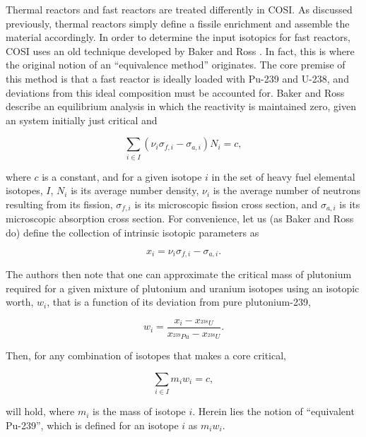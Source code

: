 Thermal reactors and fast reactors are treated differently in COSI. As discussed
previously, thermal reactors simply define a fissile enrichment and assemble the
material accordingly. In order to determine the input isotopics for fast
reactors, COSI uses an old technique developed by Baker and Ross
\cite{baker_comparison_1963}. In fact, this is where the original notion of an
``equivalence method'' originates. The core premise of this method is that a
fast reactor is ideally loaded with Pu-239 and U-238, and deviations from this
ideal composition must be accounted for. Baker and Ross describe an equilibrium
analysis in which the reactivity is maintained zero, given an system initially
just critical and

\begin{equation}
\sum_{i \in I} \left( \nu_{i} \sigma_{f,i} - \sigma_{a,i} \right) N_i = c,
\end{equation}

where $c$ is a constant, and for a given isotope $i$ in the set of heavy fuel
elemental isotopes, $I$, $N_i$ is its average number density, $\nu_{i}$ is the
average number of neutrons resulting from its fission, $\sigma_{f,i}$ is its
microscopic fission cross section, and $\sigma_{a,i}$ is its microscopic
absorption cross section. For convenience, let us (as Baker and Ross do) define
the collection of intrinsic isotopic parameters as

\begin{equation}
x_i = \nu_{i} \sigma_{f,i} - \sigma_{a,i}.
\end{equation}

The authors then note that one can approximate the critical mass of plutonium
required for a given mixture of plutonium and uranium isotopes using an isotopic
worth, $w_i$, that is a function of its deviation from pure plutonium-239,

\begin{equation}
w_i = \frac{x_i - x_{^{238}U}}
           {x_{^{239}Pu} - x_{^{238}U}}.
\end{equation}

Then, for any combination of isotopes that makes a core critical, 

\begin{equation}
\sum_{i \in I} m_i w_i = c,
\end{equation}

will hold, where $m_i$ is the mass of isotope $i$. Herein lies the notion of
``equivalent Pu-239'', which is defined for an isotope $i$ as $m_i w_i$.

